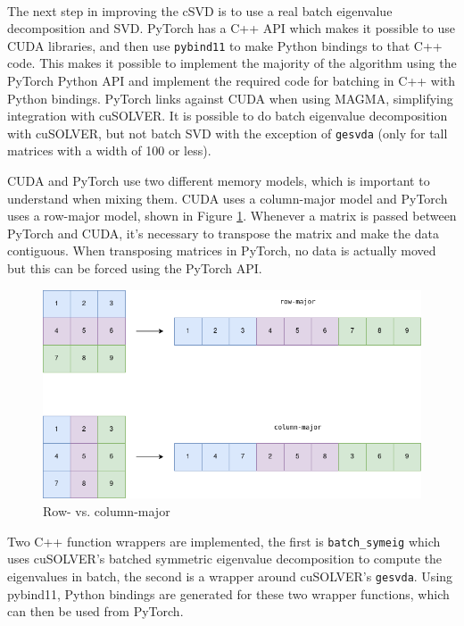 $ $ \newline

The next step in improving the cSVD is to use a real batch eigenvalue decomposition and SVD. PyTorch has a C++ API which makes it possible to use CUDA libraries, and then use \texttt{pybind11} to make Python bindings to that C++ code. This makes it possible to implement the majority of the algorithm using the PyTorch Python API and implement the required code for batching in C++ with Python bindings. PyTorch links against CUDA when using MAGMA, simplifying integration with cuSOLVER. It is possible to do batch eigenvalue decomposition with cuSOLVER, but not batch SVD with the exception of \texttt{gesvda} \cite{nvidia:cusolver} (only for tall matrices with a width of 100 or less).

CUDA and PyTorch use two different memory models, which is important to understand when mixing them. CUDA uses a column-major model and PyTorch uses a row-major model, shown in Figure \ref{fig:rowcol}. Whenever a matrix is passed between PyTorch and CUDA, it's necessary to transpose the matrix and make the data contiguous. When transposing matrices in PyTorch, no data is actually moved but this can be forced using the PyTorch API.

\begin{figure}[H]
    \centering
    \includegraphics[scale=0.45]{Figures/major.png}
    \caption{Row- vs. column-major}
    \label{fig:rowcol}
\end{figure}

Two C++ function wrappers are implemented, the first is \texttt{batch\_symeig} which uses cuSOLVER's batched symmetric eigenvalue decomposition to compute the eigenvalues in batch, the second is a wrapper around cuSOLVER's \texttt{gesvda}. Using pybind11, Python bindings are generated for these two wrapper functions, which can then be used from PyTorch.

